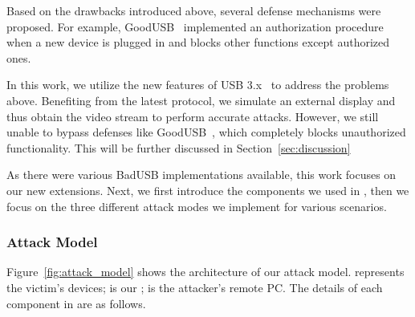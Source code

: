 Based on the drawbacks introduced above, several defense mechanisms were
proposed. For example, GoodUSB~\cite{tian2015defending}
implemented an authorization procedure when a new device is plugged in and blocks other functions except authorized ones.

In this work, we utilize the new features of \ac{USB} 3.x~\cite{usb31,usb32} to
address the problems above.  Benefiting from the latest protocol, we simulate
an external display and thus obtain the video stream to perform accurate
attacks. However, we still unable to bypass defenses like GoodUSB~\cite{tian2015defending}, which completely blocks unauthorized functionality. This will be further discussed in Section~\ref{sec:discussion}

As there were various BadUSB implementations available, this work focuses on our new extensions. Next, we first introduce the
components we used in \tool, then we focus on the three different attack modes
we implement for various scenarios.

\subsubsection{Attack Model}

Figure~\ref{fig:attack_model} shows the architecture of our attack model.  represents the victim's devices;  is our \tool;  is the attacker's remote PC. The details of each component in \tool are as follows.


